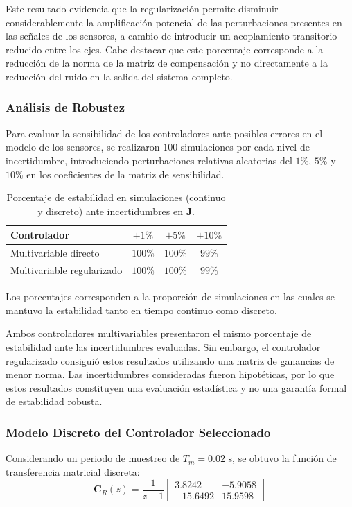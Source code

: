 \documentclass[12pt,a4paper]{article}
\begin{document}
Este resultado evidencia que la regularización permite disminuir considerablemente la amplificación potencial de las perturbaciones presentes en las señales de los sensores, a cambio de introducir un acoplamiento transitorio reducido entre los ejes. Cabe destacar que este porcentaje corresponde a la reducción de la norma de la matriz de compensación y no directamente a la reducción del ruido en la salida del sistema completo.

\subsubsection{Análisis de Robustez}
Para evaluar la sensibilidad de los controladores ante posibles errores en el modelo de los sensores, se realizaron $100$ simulaciones por cada nivel de incertidumbre, introduciendo perturbaciones relativas aleatorias del $1\%$, $5\%$ y $10\%$ en los coeficientes de la matriz de sensibilidad.

\begin{table}[H]
    \centering
    \caption{Porcentaje de estabilidad en simulaciones (continuo y discreto) ante incertidumbres en $\mathbf{J}$.}
    \label{tab:robustez_mimo}
    \begin{tabular}{lccc}
        \toprule
        \textbf{Controlador} & $\pm 1\%$ & $\pm 5\%$ & $\pm 10\%$ \\
        \midrule
        Multivariable directo & $100\%$ & $100\%$ & $99\%$ \\
        Multivariable regularizado & $100\%$ & $100\%$ & $99\%$ \\
        \bottomrule
    \end{tabular}
\end{table}

Los porcentajes corresponden a la proporción de simulaciones en las cuales se mantuvo la estabilidad tanto en tiempo continuo como discreto.

Ambos controladores multivariables presentaron el mismo porcentaje de estabilidad ante las incertidumbres evaluadas. Sin embargo, el controlador regularizado consiguió estos resultados utilizando una matriz de ganancias de menor norma. Las incertidumbres consideradas fueron hipotéticas, por lo que estos resultados constituyen una evaluación estadística y no una garantía formal de estabilidad robusta.

\subsubsection{Modelo Discreto del Controlador Seleccionado}
Considerando un periodo de muestreo de $T_m = 0.02\text{ s}$, se obtuvo la función de transferencia matricial discreta:
\begin{equation}
\boxed{
\mathbf{C}_R(z) = \frac{1}{z - 1}\begin{bmatrix} 3.8242 & -5.9058 \\ -15.6492 & 15.9598 \end{bmatrix}
}
\end{equation}
\end{document}
